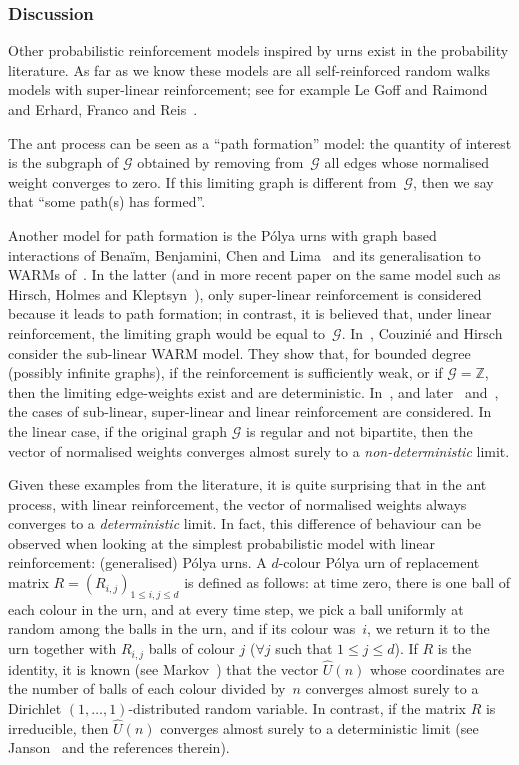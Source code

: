 \documentclass[11pt]{article}
\let\mathcal\mathscr
\numberwithin{equation}{section}
\theoremstyle{definition}
\begin{document}
\subsubsection*{Discussion}
Other {probabilistic reinforcement} models inspired by urns exist in the probability literature.
As far as we know these models are all self-reinforced random walks models with super-linear reinforcement;
see for example Le Goff and Raimond~\cite{LGR} and Erhard, Franco and Reis~\cite{EFR}.

The ant process can be seen as a ``path formation'' model:
the quantity of interest is the subgraph of $\mathcal G$
obtained by removing from~$\mathcal G$ all edges whose normalised weight converges to zero.
If this limiting graph is different from~$\mathcal G$, then we say that ``some path(s) has formed''.

Another model for path formation is the Pólya urns with graph based interactions
of Benaïm, Benjamini, Chen and Lima~\cite{BBCL}
and its generalisation to WARMs of~\cite{WARM}.
In the latter (and in more recent paper on the same model such as Hirsch, Holmes and Kleptsyn~\cite{WARM_new}),
only super-linear reinforcement is considered because it leads to path formation;
in contrast, it is believed that, under linear reinforcement,
the limiting graph would be equal to~$\mathcal G$.
{In~\cite{CH21}, Couzinié and Hirsch consider the sub-linear WARM model.
They show that, for bounded degree (possibly infinite graphs),
if the reinforcement is sufficiently weak, or if $\mathcal G = \mathbb Z$,
then the limiting edge-weights exist and are deterministic.}
In~\cite{BBCL}, and later~\cite{CL} and~\cite{Lima},
the cases of sub-linear, super-linear and linear reinforcement are considered.
In the linear case, if the original graph $\mathcal G$ is regular and not bipartite,
then the vector of normalised weights converges almost surely
to a \emph{non-deterministic} limit.

Given these examples from the literature, it is quite surprising that in the ant process, with linear
reinforcement, the vector of normalised weights always converges to a \emph{deterministic} limit.
In fact, this difference of behaviour can be observed when looking at the simplest probabilistic model with linear reinforcement: (generalised) Pólya urns.
A $d$-colour Pólya urn of replacement matrix $R = (R_{i,j})_{1\leq i,j\leq d}$ is defined as follows:
at time zero, there is one ball of each colour in the urn, and
at every time step, we pick a ball uniformly at random among the balls in the urn, and if its colour was~$i$, we return it to the urn together with $R_{i,j}$ balls of colour $j$ ($\forall j$  such that $1\leq j\leq d$).
If $R$ is the identity, it is known (see Markov~\cite{Markov}) that the vector $\hat U(n)$ whose coordinates are the number of balls of each colour divided by~$n$ converges almost surely to a Dirichlet $(1, \ldots, 1)$-distributed random variable.
In contrast, if the matrix $R$ is irreducible, then $\hat U(n)$ converges almost surely to a deterministic limit (see Janson~\cite{Janson04} and the references therein).
\end{document}

